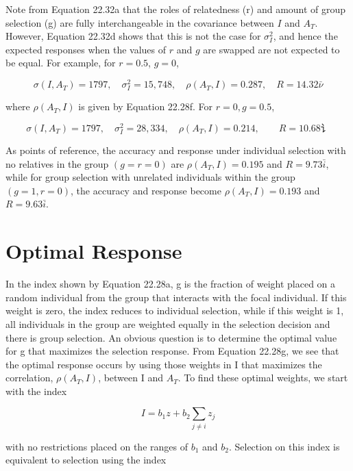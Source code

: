 \documentclass{article}
\begin{document}
Note from Equation 22.32a that the roles of relatedness (r) and amount of group selection (g) are fully interchangeable in the covariance between $I$ and $A_T$. However, Equation 22.32d shows that this is not the case for $\sigma_I^2$, and hence the expected responses when the values of $r$ and $g$ are swapped are not expected to be equal. For example, for $r = 0.5$, $g = 0$,

\begin{equation}
\sigma(I,A_{T})=1797,\quad\sigma_{I}^{2}=15,748,\quad\rho(A_{T},I)=0.287,\quad R=14.32\bar{\nu}
\end{equation}

where  $ \rho(A_T, I) $ is given by Equation 22.28f. For  $ r = 0, g = 0.5 $,

\begin{equation}
\sigma(I,A_{T})=1797,\quad\sigma_{I}^{2}=28,334,\quad\rho(A_{T},I)=0.214,\qquad R=10.68 讠
\end{equation}

As points of reference, the accuracy and response under individual selection with no relatives in the group  $ (g = r = 0) $ are  $ \rho(A_T, I) = 0.195 $ and  $ R = 9.73\bar{i} $, while for group selection with unrelated individuals within the group  $ (g = 1, r = 0) $, the accuracy and response become  $ \rho(A_T, I) = 0.193 $ and  $ R = 9.63\bar{i} $.

\section{Optimal Response}
In the index shown by Equation 22.28a, g is the fraction of weight placed on a random individual from the group that interacts with the focal individual. If this weight is zero, the index reduces to individual selection, while if this weight is 1, all individuals in the group are weighted equally in the selection decision and there is group selection. An obvious question is to determine the optimal value for g that maximizes the selection response. From Equation 22.28g, we see that the optimal response occurs by using those weights in I that maximizes the correlation,  $ \rho(A_T, I) $, between I and  $ A_T $. To find these optimal weights, we start with the index

\begin{equation}
I=b_{1}z+b_{2}\sum_{j\neq i}z_{j}
\tag{22.33a}
\label{eq:22_33a}
\end{equation}

with no restrictions placed on the ranges of  $ b_{1} $ and  $ b_{2} $. Selection on this index is equivalent to selection using the index
\end{document}
